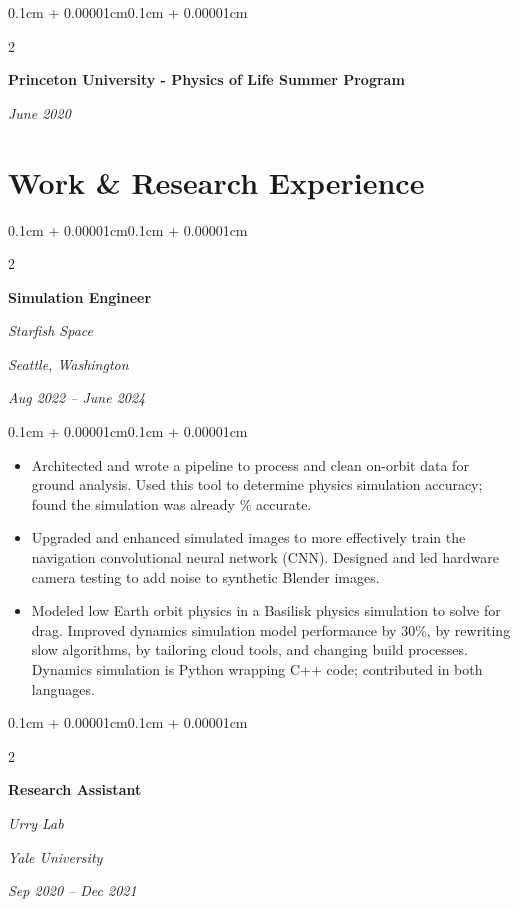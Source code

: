 \documentclass[10pt,letterpaper]{article}
\newenvironment{highlights}{
    \begin{itemize}[
        topsep=0.1cm,
        parsep=0.1cm,
        partopsep=0pt,
        itemsep=0pt,
        leftmargin=0.4cm + 10pt
    ]
}{
    \end{itemize}
}
\newenvironment{onecolentry}{
    \begin{adjustwidth}{0.1cm + 0.00001cm}{0.1cm + 0.00001cm}
}{
    \end{adjustwidth}
}
\newenvironment{twocolentry}[2][]{
    \onecolentry
    \def\secondColumn{#2}
    \setcolumnwidth{\fill,4.5cm}
    \begin{paracol}{2}
}{
    \switchcolumn \raggedleft \secondColumn
    \end{paracol}
    \endonecolentry
}
\begin{document}
        \begin{twocolentry}{
        \textit{June 2020}}
            \textbf{Princeton University - Physics of Life Summer Program}
        \end{twocolentry}

    
    \section{Work \& Research Experience}    
        \begin{twocolentry}{
        \textit{Seattle, Washington}   
        
        \textit{Aug 2022 – June 2024}}
            \textbf{Simulation Engineer}
            
            \textit{Starfish Space}
        \end{twocolentry}

        \vspace{0.10 cm}
        \begin{onecolentry}
            \begin{highlights}
                \item Architected and wrote a pipeline to process and clean on-orbit data for ground analysis. Used this tool to determine physics simulation accuracy; found the simulation was already \% accurate. 
                \item Upgraded and enhanced simulated images to more effectively train the navigation convolutional neural network (CNN). Designed and led hardware camera testing to add noise to synthetic Blender  images. 
                \item Modeled low Earth orbit physics in a Basilisk physics simulation to solve for drag. Improved dynamics simulation model performance by 30\%, by rewriting slow algorithms, by tailoring cloud tools, and changing build processes. Dynamics simulation is Python wrapping C++ code; contributed in both languages.
            \end{highlights}
        \end{onecolentry}


        \vspace{0.2 cm}

        \begin{twocolentry}{
        \textit{Yale University}    
            
        \textit{Sep 2020 – Dec 2021}}
            \textbf{Research Assistant}
            
            \textit{Urry Lab}
        \end{twocolentry}
\end{document}

